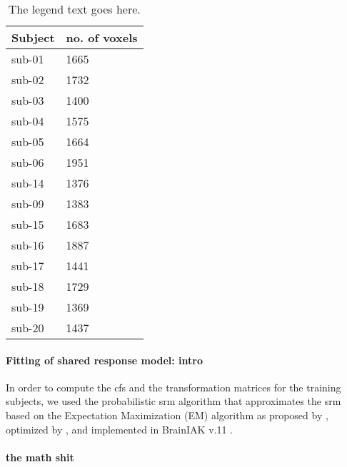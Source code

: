 

\begin{table*}[btp]
    \caption{
    \textbf{Table heading.}
    Number of remaining voxels after time series data of each paradigm
    and subject were masked with the union of individual \acp{ppa} that was
    warped from MNI space into each individual's subjects-space and the
    subject-specific field of view of audio-description.}

\label{tab:ppamaskvoxels}
\begin{tabular}{ll}
    \toprule
    \textbf{Subject} & \textbf{no. of voxels} \\
    \midrule
    sub-01 & 1665 \tabularnewline
    sub-02 & 1732 \tabularnewline
    sub-03 & 1400 \tabularnewline
    sub-04 & 1575 \tabularnewline
    sub-05 & 1664 \tabularnewline
    sub-06 & 1951 \tabularnewline
    sub-14 & 1376 \tabularnewline
    sub-09 & 1383 \tabularnewline
    sub-15 & 1683 \tabularnewline
    sub-16 & 1887 \tabularnewline
    sub-17 & 1441 \tabularnewline
    sub-18 & 1729 \tabularnewline
    sub-19 & 1369 \tabularnewline
    sub-20 & 1437 \tabularnewline
    \bottomrule
\end{tabular}
\caption*{The legend text goes here.}
\end{table*}


\paragraph{Fitting of shared response model: intro}


In order to compute the \ac{cfs} and the transformation matrices for the
training subjects, we used the probabilistic \ac{srm} algorithm that
approximates the \ac{srm} based on the Expectation Maximization (EM) algorithm
as proposed by \citep{chen2015reduced}, optimized by
\citet{anderson2016enabling}, and implemented in BrainIAK v.11 \citep[Brain
Imaging Analysis Kit;][]{kumar2020brainiak, kumar2020brainiaktutorial}.


\paragraph{the math shit}

